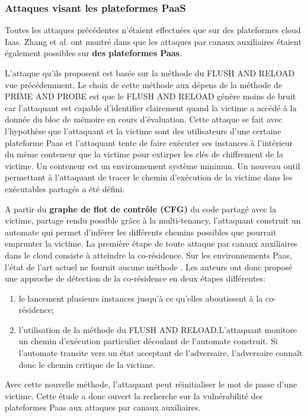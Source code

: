 \subsubsection{Attaques visant les plateformes PaaS}
Toutes les attaques  précédentes n’étaient effectuées que sur des plateformes cloud Iaas.  Zhang et al. ont montré dans \cite{ZhangPaas} que les attaques par canaux auxiliaires étaient également possibles sur \textbf{ des plateformes Paas}.
\par L’attaque qu’ils proposent est basée sur la méthode du FLUSH AND RELOAD vue précédemment. Le choix de cette méthode aux dépens de  la méthode de PRIME AND PROBE est que le FLUSH AND RELOAD  génère moins de bruit car l’attaquant est capable d’identifier clairement quand la victime a accédé à  la donnée du bloc de mémoire en cours d’évaluation. Cette attaque se fait avec l’hypothèse que l’attaquant et la victime sont des utilisateurs d’une certaine plateforme Paas et  l’attaquant  tente de faire  exécuter ses instances à l’intérieur du même conteneur que la victime pour extirper les clés de chiffrement de la victime. Un conteneur est un environnement système minimun. Un nouveau outil permettant à l’attaquant de tracer le chemin d’exécution de la victime dans  les exécutables  partagés a été défini. 
\par A partir du \textbf{graphe de flot de contrôle (CFG)} du code partagé avec la victime, partage rendu possible grâce à la multi-tenancy, l’attaquant construit un automate  qui  permet d’inférer les différents chemins possibles que pourrait emprunter la victime. La première étape de toute attaque par canaux auxiliaires dans le cloud consiste à atteindre la co-résidence. Sur les environnements Paas, l’état de l’art actuel ne fournit aucune méthode . Les auteurs ont donc proposé une approche de détection de la co-résidence en deux étapes différentes:
\begin{enumerate}
 \item le lancement plusieurs instances jusqu’à ce qu’elles aboutissent à la co-résidence;
 \item l'utilisation de la méthode du FLUSH AND RELOAD.L’attaquant  monitore un chemin d’exécution particulier  découlant de l’automate construit. Si l’automate transite vers un état acceptant de l’adversaire, l’adversaire connaît donc le chemin critique de la victime. 
\end{enumerate}

Avec cette nouvelle méthode, l'attaquant peut réinitialiser le mot de passe d’une victime. Cette étude a donc ouvert la recherche sur la vulnérabilité des plateformes Paas aux attaques par canaux auxiliaires.\newline

